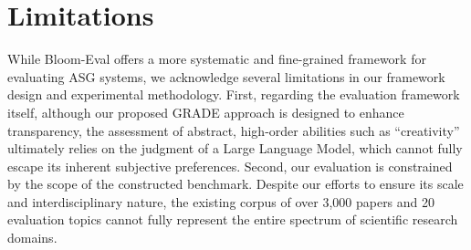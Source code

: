 \documentclass[11pt]{article}
\begin{document}
\section*{Limitations}
While Bloom-Eval offers a more systematic and fine-grained framework for evaluating ASG systems, we acknowledge several limitations in our framework design and experimental methodology. First, regarding the evaluation framework itself, although our proposed GRADE approach is designed to enhance transparency, the assessment of abstract, high-order abilities such as ``creativity'' ultimately relies on the judgment of a Large Language Model, which cannot fully escape its inherent subjective preferences. Second, our evaluation is constrained by the scope of the constructed benchmark. Despite our efforts to ensure its scale and interdisciplinary nature, the existing corpus of over 3,000 papers and 20 evaluation topics cannot fully represent the entire spectrum of scientific research domains.



%

\end{document}
